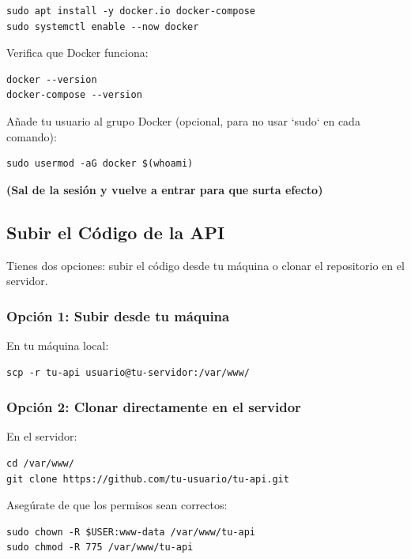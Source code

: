 \documentclass[11pt]{article}
\begin{document}
\begin{verbatim}
sudo apt install -y docker.io docker-compose
sudo systemctl enable --now docker
\end{verbatim}

Verifica que Docker funciona:

\begin{verbatim}
docker --version
docker-compose --version
\end{verbatim}

Añade tu usuario al grupo Docker (opcional, para no usar `sudo` en
cada comando):

\begin{verbatim}
sudo usermod -aG docker $(whoami)
\end{verbatim}

\textbf{\textbf{(Sal de la sesión y vuelve a entrar para que surta efecto)}}

\subsection{Subir el Código de la API}
\label{sec:orgc9bc209}

Tienes dos opciones: subir el código desde tu máquina o clonar el
repositorio en el servidor.

\subsubsection*{Opción 1: Subir desde tu máquina}
\label{sec:org1543641}
En tu máquina local:

\begin{verbatim}
scp -r tu-api usuario@tu-servidor:/var/www/
\end{verbatim}

\subsubsection*{Opción 2: Clonar directamente en el servidor}
\label{sec:org4911543}
En el servidor:

\begin{verbatim}
cd /var/www/
git clone https://github.com/tu-usuario/tu-api.git
\end{verbatim}

Asegúrate de que los permisos sean correctos:

\begin{verbatim}
sudo chown -R $USER:www-data /var/www/tu-api
sudo chmod -R 775 /var/www/tu-api
\end{verbatim}
\end{document}
